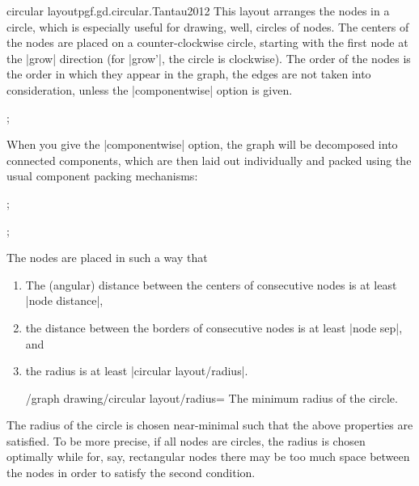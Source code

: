 \begin{gdalgorithm}{circular layout}{pgf.gd.circular.Tantau2012}
  This layout arranges the nodes in a circle, which is especially
  useful for drawing, well, circles of nodes. The centers of the nodes
  are placed on a counter-clockwise circle, starting with the first
  node at the |grow| direction (for |grow'|, the circle is
  clockwise). The order of the nodes is the order in which they appear
  in the graph, the edges are not taken into consideration, unless the
  |componentwise| option is given.

\begin{codeexample}[]
\tikz[>=spaced stealth']
  ;    
\end{codeexample}

  When you give the |componentwise| option, the graph will be
  decomposed into connected components, which are then laid out
  individually and packed using the usual component packing
  mechanisms:
  
\begin{codeexample}[]
\tikz {};    
\end{codeexample}
\begin{codeexample}[]
\tikz {};    
\end{codeexample}

  The nodes are placed in such a way that
  \begin{enumerate}
  \item The (angular) distance between the centers of consecutive
    nodes is at least  |node distance|,
  \item the distance between the borders of consecutive nodes is at
    least |node sep|, and
  \item the radius is at least |circular layout/radius|.
    \begin{key}{/graph drawing/circular layout/radius=}
      The minimum radius of the circle.
    \end{key}
  \end{enumerate}
  The radius of the circle is chosen near-minimal such that the above
  properties are satisfied. To be more precise, if all nodes are
  circles, the radius is chosen optimally while for, say, rectangular
  nodes there may be too much space between the nodes in order to
  satisfy the second condition.


\end{gdalgorithm}
